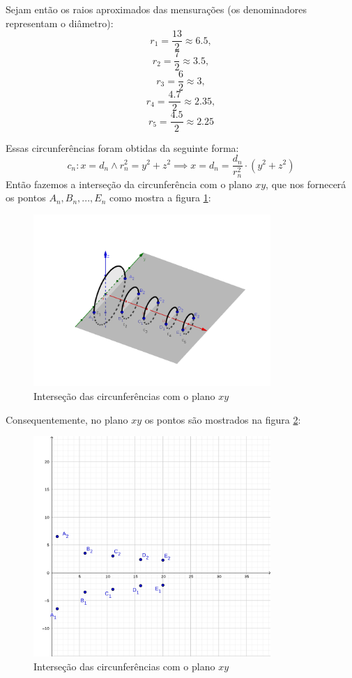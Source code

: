 \documentclass[english,ngerman,parskip=half]{scrartcl}
\begin{document}
\begin{enumerate}
        Sejam então os raios aproximados das mensurações (os denominadores representam o diâmetro): \\
        $$ r_1 = \dfrac{13}{2} \approx 6.5,$$ 
        $$ r_2 = \displaystyle \dfrac{7}{2} \approx 3.5, $$
        $$r_3 = \dfrac{6}{2} \approx 3,$$
        $$r_4 = \dfrac{4.7}{2} \approx 2.35,$$
        $$r_5 = \dfrac{4.5}{2} \approx 2.25$$

        Essas circunferências foram obtidas da seguinte forma:
        $$c_n: x = d_n  \land r_n^2 = y^2 + z^2 \implies x = d_n = \dfrac{d_n}{r_n^2} \cdot \left( y^2 + z^2 \right)$$
        Então fazemos a interseção da circunferência com o plano $xy$, que nos 
        fornecerá os pontos $A_n, B_n, ..., E_n$ como mostra a figura \ref{3d-intersecao-circ-xy}:

        \begin{figure}[ht!]
            \centering
            \includegraphics[width=90mm]{./images/3d-intersecao-circ-xy.png}
            \caption{Interseção das circunferências com o plano $xy$ \label{3d-intersecao-circ-xy}}
        \end{figure}

        Consequentemente, no plano $xy$ os pontos são mostrados na figura \ref{figu}:

        \begin{figure}[ht!]
            \centering
            \includegraphics[width=90mm]{./images/2d-intersecao-circ-xy.png}
            \caption{Interseção das circunferências com o plano $xy$}
            \label{figu}
        \end{figure}


\end{enumerate}
\end{document}
